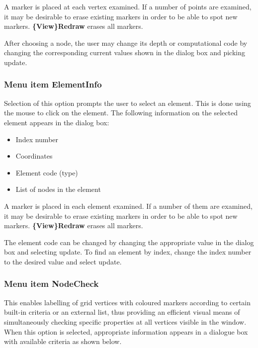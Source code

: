 \documentclass{article}
\begin{document}
A marker is placed at each vertex examined. If a number of points are examined, it may be desirable to erase existing markers in order to be able to spot new markers. \textbf{\{View\}Redraw} erases all markers.

After choosing a node, the user may change its depth or computational code by changing the corresponding current values shown in the dialog box and picking update.

\subsubsection{Menu item ElementInfo}
Selection of this option prompts the user to select an element.  This is done using the mouse to click on the element. The following information on the selected element appears in the dialog box:

\begin{itemize}
\item Index number
\item Coordinates
\item Element code (type)
\item List of nodes in the element 
\end{itemize}
A marker is placed in each element examined. If a number of them are examined, it may be desirable to erase existing markers in order to be able to spot new markers. \textbf{\{View\}Redraw} erases all markers.

The element code can be changed by changing the appropriate value in the dialog box and selecting update. To find an element by index, change the index number to the desired value and select update.

\subsubsection{Menu item NodeCheck}
This enables labelling of grid vertices with coloured markers according to certain built-in criteria or an external list, thus providing an efficient visual means of simultaneously checking specific properties at all vertices visible in the window. When this option is selected, appropriate information appears in a dialogue box with available criteria as shown below.
\end{document}
